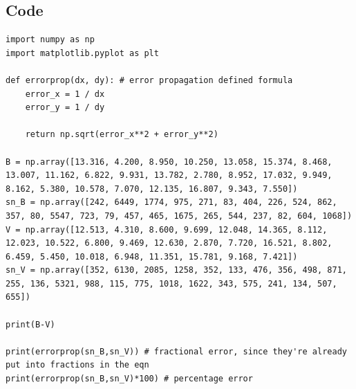 \documentclass[12pt]{article}
\begin{document}
\label{tab:A}

\subsection*{Code}

%

\begin{minipage}{\linewidth}
\captionsetup{hypcap=false}

\begin{mintedbox}
\begin{verbatim}
import numpy as np
import matplotlib.pyplot as plt

def errorprop(dx, dy): # error propagation defined formula
    error_x = 1 / dx
    error_y = 1 / dy

    return np.sqrt(error_x**2 + error_y**2)

B = np.array([13.316, 4.200, 8.950, 10.250, 13.058, 15.374, 8.468, 13.007, 11.162, 6.822, 9.931, 13.782, 2.780, 8.952, 17.032, 9.949, 8.162, 5.380, 10.578, 7.070, 12.135, 16.807, 9.343, 7.550])
sn_B = np.array([242, 6449, 1774, 975, 271, 83, 404, 226, 524, 862, 357, 80, 5547, 723, 79, 457, 465, 1675, 265, 544, 237, 82, 604, 1068])
V = np.array([12.513, 4.310, 8.600, 9.699, 12.048, 14.365, 8.112, 12.023, 10.522, 6.800, 9.469, 12.630, 2.870, 7.720, 16.521, 8.802, 6.459, 5.450, 10.018, 6.948, 11.351, 15.781, 9.168, 7.421])
sn_V = np.array([352, 6130, 2085, 1258, 352, 133, 476, 356, 498, 871, 255, 136, 5321, 988, 115, 775, 1018, 1622, 343, 575, 241, 134, 507, 655])

print(B-V)

print(errorprop(sn_B,sn_V)) # fractional error, since they're already put into fractions in the eqn
print(errorprop(sn_B,sn_V)*100) # percentage error

\end{verbatim}
\end{mintedbox}

\end{minipage}

%
\end{document}
